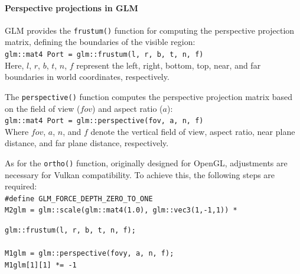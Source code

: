 \paragraph*{Perspective projections in GLM}
GLM provides the \texttt{frustum()} function for computing the perspective projection matrix, defining the boundaries of the visible region: \\
\texttt{glm::mat4 Port = glm::frustum(l, r, b, t, n, f)} \\
Here, $l$, $r$, $b$, $t$, $n$, $f$ represent the left, right, bottom, top, near, and far boundaries in world coordinates, respectively.

The \texttt{perspective()} function computes the perspective projection matrix based on the field of view ($fov$) and aspect ratio ($a$): \\
\texttt{glm::mat4 Port = glm::perspective(fov, a, n, f)} \\
Where $fov$, $a$, $n$, and $f$ denote the vertical field of view, aspect ratio, near plane distance, and far plane distance, respectively.

As for the \texttt{ortho()} function, originally designed for OpenGL, adjustments are necessary for Vulkan compatibility. To achieve this, the following steps are required: \\
\texttt{\#define GLM\_FORCE\_DEPTH\_ZERO\_TO\_ONE} \\
\texttt{M2glm = glm::scale(glm::mat4(1.0), glm::vec3(1,-1,1)) *} 

\qquad\:\:\:\texttt{glm::frustum(l, r, b, t, n, f);} \\
\\
\texttt{M1glm = glm::perspective(fovy, a, n, f);}  \\
\texttt{M1glm[1][1] *= -1} 